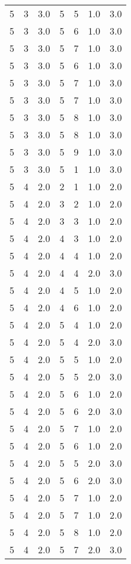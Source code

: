 \documentclass[a4paper,12pt]{article}
\begin{document}
\begin{center}
\begin{longtable}{ c c c | c c c | c }
        5 & 3 & 3.0 & 5 & 5 & 1.0 & 3.0 \\
        5 & 3 & 3.0 & 5 & 6 & 1.0 & 3.0 \\
        5 & 3 & 3.0 & 5 & 7 & 1.0 & 3.0 \\
        5 & 3 & 3.0 & 5 & 6 & 1.0 & 3.0 \\
        5 & 3 & 3.0 & 5 & 7 & 1.0 & 3.0 \\
        5 & 3 & 3.0 & 5 & 7 & 1.0 & 3.0 \\
        5 & 3 & 3.0 & 5 & 8 & 1.0 & 3.0 \\
        5 & 3 & 3.0 & 5 & 8 & 1.0 & 3.0 \\
        5 & 3 & 3.0 & 5 & 9 & 1.0 & 3.0 \\
        5 & 3 & 3.0 & 5 & 1 & 1.0 & 3.0 \\
        5 & 4 & 2.0 & 2 & 1 & 1.0 & 2.0 \\
        5 & 4 & 2.0 & 3 & 2 & 1.0 & 2.0 \\
        5 & 4 & 2.0 & 3 & 3 & 1.0 & 2.0 \\
        5 & 4 & 2.0 & 4 & 3 & 1.0 & 2.0 \\
        5 & 4 & 2.0 & 4 & 4 & 1.0 & 2.0 \\
        5 & 4 & 2.0 & 4 & 4 & 2.0 & 3.0 \\
        5 & 4 & 2.0 & 4 & 5 & 1.0 & 2.0 \\
        5 & 4 & 2.0 & 4 & 6 & 1.0 & 2.0 \\
        5 & 4 & 2.0 & 5 & 4 & 1.0 & 2.0 \\
        5 & 4 & 2.0 & 5 & 4 & 2.0 & 3.0 \\
        5 & 4 & 2.0 & 5 & 5 & 1.0 & 2.0 \\
        5 & 4 & 2.0 & 5 & 5 & 2.0 & 3.0 \\
        5 & 4 & 2.0 & 5 & 6 & 1.0 & 2.0 \\
        5 & 4 & 2.0 & 5 & 6 & 2.0 & 3.0 \\
        5 & 4 & 2.0 & 5 & 7 & 1.0 & 2.0 \\
        5 & 4 & 2.0 & 5 & 6 & 1.0 & 2.0 \\
        5 & 4 & 2.0 & 5 & 5 & 2.0 & 3.0 \\
        5 & 4 & 2.0 & 5 & 6 & 2.0 & 3.0 \\
        5 & 4 & 2.0 & 5 & 7 & 1.0 & 2.0 \\
        5 & 4 & 2.0 & 5 & 7 & 1.0 & 2.0 \\
        5 & 4 & 2.0 & 5 & 8 & 1.0 & 2.0 \\
        5 & 4 & 2.0 & 5 & 7 & 2.0 & 3.0 \\

\end{longtable}
\end{center}
\end{document}
